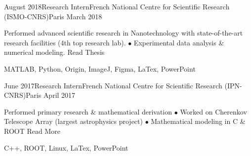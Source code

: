 \begin{experiences}
  \experience
    {August 2018}{Research Intern}{French National Centre for Scientific Research (ISMO-CNRS)}{Paris}
    {March 2018}
    {
\begin{description}
Performed advanced scientific research in Nanotechnology with state-of-the-art research facilities (4th top research lab). $\bullet$ Experimental data analysis \& numerical modeling. \hfill {} {\footnotesize{Read Thesis}}
\end{description}
}
    {MATLAB, Python, Origin, ImageJ, Figma, LaTex, PowerPoint}
\end{experiences}
\vspace*{-15px} 
\begin{experiences}
  \experience
    {June 2017}{Research Intern}{French National Centre for Scientific Research (IPN-CNRS)}{Paris}
    {April 2017}
    {
\begin{description}
Performed primary research \& mathematical derivation $\bullet$ Worked on Cherenkov Telescope Array (largest astrophysics project) $\bullet$ Mathematical modeling in C \& ROOT  \hfill {} {\footnotesize{Read More}}
\end{description}
}
    {C++, ROOT, Linux, LaTex, PowerPoint}
\end{experiences} 